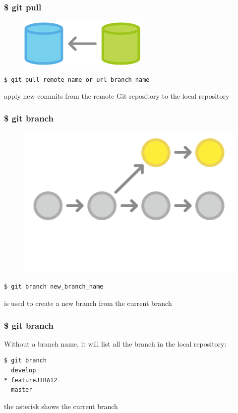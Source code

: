 \documentclass{beamer}
\begin{document}
\begin{frame}[fragile]
    \frametitle{\$ git pull}
    \begin{figure}[h!]
        \begin{center}
            \includegraphics[scale=0.7]{pull.png}
        \end{center}
    \end{figure}
    \begin{verbatim}
$ git pull remote_name_or_url branch_name
    \end{verbatim}
    apply new commits from the remote Git repository to the local repository
\end{frame}

\begin{frame}[fragile]
    \frametitle{\$ git branch}
    \begin{figure}[h!]
        \begin{center}
            \includegraphics[scale=0.4]{branch.png}
        \end{center}
    \end{figure}
    \begin{verbatim}
$ git branch new_branch_name
    \end{verbatim}
    is used to create a new branch from the current branch
\end{frame}

\begin{frame}[fragile]
    \frametitle{\$ git branch}
    Without a branch name, it will list all the branch in the local repository:
    \begin{verbatim}
$ git branch
  develop
* featureJIRA12
  master
    \end{verbatim}
the asterisk shows the current branch
\end{frame}
\end{document}
